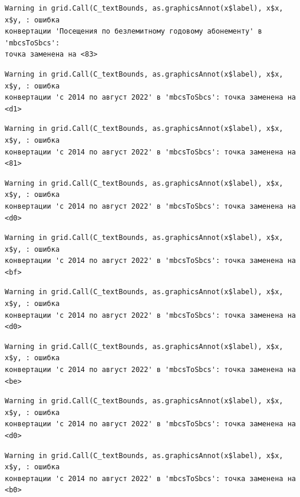 \documentclass[
  letterpaper,
  DIV=11,
  numbers=noendperiod]{scrreprt}
\begin{document}
\begin{verbatim}
Warning in grid.Call(C_textBounds, as.graphicsAnnot(x$label), x$x, x$y, : ошибка
конвертации 'Посещения по безлемитному годовому абонементу' в 'mbcsToSbcs':
точка заменена на <83>
\end{verbatim}

\begin{verbatim}
Warning in grid.Call(C_textBounds, as.graphicsAnnot(x$label), x$x, x$y, : ошибка
конвертации 'с 2014 по август 2022' в 'mbcsToSbcs': точка заменена на <d1>
\end{verbatim}

\begin{verbatim}
Warning in grid.Call(C_textBounds, as.graphicsAnnot(x$label), x$x, x$y, : ошибка
конвертации 'с 2014 по август 2022' в 'mbcsToSbcs': точка заменена на <81>
\end{verbatim}

\begin{verbatim}
Warning in grid.Call(C_textBounds, as.graphicsAnnot(x$label), x$x, x$y, : ошибка
конвертации 'с 2014 по август 2022' в 'mbcsToSbcs': точка заменена на <d0>
\end{verbatim}

\begin{verbatim}
Warning in grid.Call(C_textBounds, as.graphicsAnnot(x$label), x$x, x$y, : ошибка
конвертации 'с 2014 по август 2022' в 'mbcsToSbcs': точка заменена на <bf>
\end{verbatim}

\begin{verbatim}
Warning in grid.Call(C_textBounds, as.graphicsAnnot(x$label), x$x, x$y, : ошибка
конвертации 'с 2014 по август 2022' в 'mbcsToSbcs': точка заменена на <d0>
\end{verbatim}

\begin{verbatim}
Warning in grid.Call(C_textBounds, as.graphicsAnnot(x$label), x$x, x$y, : ошибка
конвертации 'с 2014 по август 2022' в 'mbcsToSbcs': точка заменена на <be>
\end{verbatim}

\begin{verbatim}
Warning in grid.Call(C_textBounds, as.graphicsAnnot(x$label), x$x, x$y, : ошибка
конвертации 'с 2014 по август 2022' в 'mbcsToSbcs': точка заменена на <d0>
\end{verbatim}

\begin{verbatim}
Warning in grid.Call(C_textBounds, as.graphicsAnnot(x$label), x$x, x$y, : ошибка
конвертации 'с 2014 по август 2022' в 'mbcsToSbcs': точка заменена на <b0>
\end{verbatim}
\end{document}

